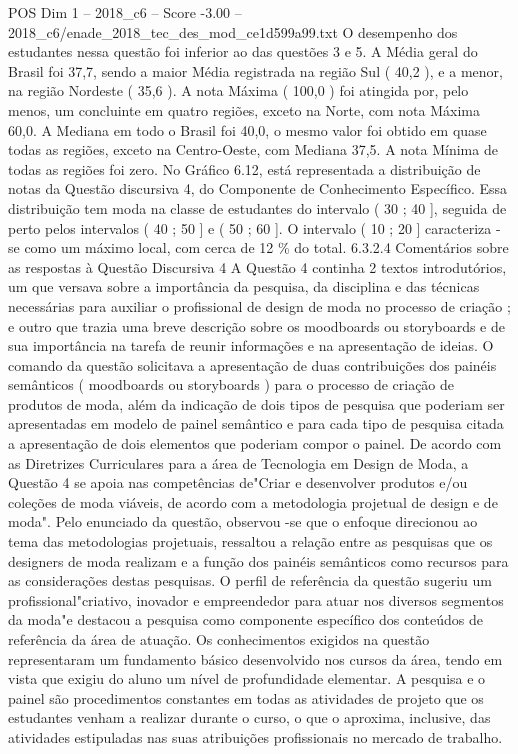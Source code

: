 \begin{textsample}{POS Dim 1 – 2018\_c6 – Score -3.00 – 2018\_c6/enade\_2018\_tec\_des\_mod\_ce1d599a99.txt}
O desempenho dos estudantes nessa questão foi inferior ao das questões 3 e 5.
A Média geral do Brasil foi 37,7, sendo a maior Média registrada na região Sul ( 40,2 ), e a menor, na região Nordeste ( 35,6 ).
A nota Máxima ( 100,0 ) foi atingida por, pelo menos, um concluinte em quatro regiões, exceto na Norte, com nota Máxima 60,0.
A Mediana em todo o Brasil foi 40,0, o mesmo valor foi obtido em quase todas as regiões, exceto na Centro-Oeste, com Mediana 37,5.
A nota Mínima de todas as regiões foi zero.
No Gráfico 6.12, está representada a distribuição de notas da Questão discursiva 4, do Componente de Conhecimento Específico.
Essa distribuição tem moda na classe de estudantes do intervalo ( 30 ; 40 ], seguida de perto pelos intervalos ( 40 ; 50 ] e ( 50 ; 60 ].
O intervalo ( 10 ; 20 ] caracteriza -se como um máximo local, com cerca de 12 \% do total. 6.3.2.4 Comentários sobre as respostas à Questão Discursiva 4 A Questão 4 continha 2 textos introdutórios, um que versava sobre a importância da pesquisa, da disciplina e das técnicas necessárias para auxiliar o profissional de design de moda no processo de criação ; e outro que trazia uma breve descrição sobre os moodboards ou storyboards e de sua importância na tarefa de reunir informações e na apresentação de ideias.
O comando da questão solicitava a apresentação de duas contribuições dos painéis semânticos ( moodboards ou storyboards ) para o processo de criação de produtos de moda, além da indicação de dois tipos de pesquisa que poderiam ser apresentadas em modelo de painel semântico e para cada tipo de pesquisa citada a apresentação de dois elementos que poderiam compor o painel.
De acordo com as Diretrizes Curriculares para a área de Tecnologia em Design de Moda, a Questão 4 se apoia nas competências de"Criar e desenvolver produtos e/ou coleções de moda viáveis, de acordo com a metodologia projetual de design e de moda".
Pelo enunciado da questão, observou -se que o enfoque direcionou ao tema das metodologias projetuais, ressaltou a relação entre as pesquisas que os designers de moda realizam e a função dos painéis semânticos como recursos para as considerações destas pesquisas.
O perfil de referência da questão sugeriu um profissional"criativo, inovador e empreendedor para atuar nos diversos segmentos da moda"e destacou a pesquisa como componente específico dos conteúdos de referência da área de atuação.
Os conhecimentos exigidos na questão representaram um fundamento básico desenvolvido nos cursos da área, tendo em vista que exigiu do aluno um nível de profundidade elementar.
A pesquisa e o painel são procedimentos constantes em todas as atividades de projeto que os estudantes venham a realizar durante o curso, o que o aproxima, inclusive, das atividades estipuladas nas suas atribuições profissionais no mercado de trabalho.

\end{textsample}
